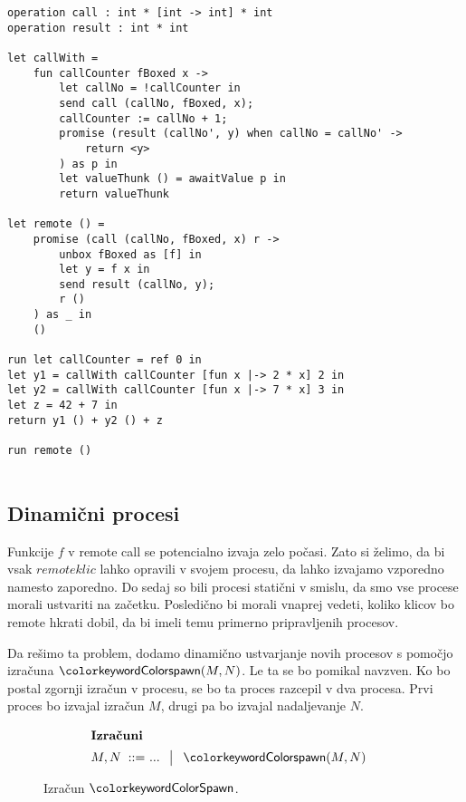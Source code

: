 \begin{lstlisting}[caption={Računanje zahtevne funkcije v ozadju.},label={prog:razsiritev-1},float,floatplacement=h]
operation call : int * [int -> int] * int
operation result : int * int

let callWith =
	fun callCounter fBoxed x ->
		let callNo = !callCounter in
		send call (callNo, fBoxed, x);
		callCounter := callNo + 1;
		promise (result (callNo', y) when callNo = callNo' ->
			return <y>
		) as p in
		let valueThunk () = awaitValue p in
		return valueThunk

let remote () =
	promise (call (callNo, fBoxed, x) r ->
		unbox fBoxed as [f] in
		let y = f x in
		send result (callNo, y);
		r ()
	) as _ in
	()

run	let callCounter = ref 0 in
let y1 = callWith callCounter [fun x |-> 2 * x] 2 in
let y2 = callWith callCounter [fun x |-> 7 * x] 3 in
let z = 42 + 7 in
return y1 () + y2 () + z

run remote ()
	
\end{lstlisting}

\subsection{Dinamični procesi}

Funkcije $f$ v remote call se potencialno izvaja zelo počasi. Zato si želimo, da bi vsak $remote klic$ lahko opravili v svojem procesu, da lahko izvajamo vzporedno namesto zaporedno. 
Do sedaj so bili procesi statični v smislu, da smo vse procese morali ustvariti na začetku.
Posledično bi morali vnaprej vedeti, koliko klicov bo remote hkrati dobil, da bi imeli temu primerno pripravljenih procesov.

Da rešimo ta problem, dodamo dinamično ustvarjanje novih procesov s pomočjo izračuna $\tmspawn{M}{N}$. 
Le ta se bo pomikal navzven. Ko bo postal zgornji izračun v procesu, se bo ta proces razcepil v dva procesa. 
Prvi proces bo izvajal izračun $M$, drugi pa bo izvajal nadaljevanje $N$.


\begin{figure}[h]	
	\centering
	\small
	\begin{align*}
	\shortintertext{\textbf{Izračuni}}
	M, N
	\bnfis & ... \,\bnfor\! \tmspawn{M}{N}
	\end{align*}
	
	\caption{Izračun $\tmkw{Spawn}$.}
	\label{fig:izračun-spawn}
\end{figure}

